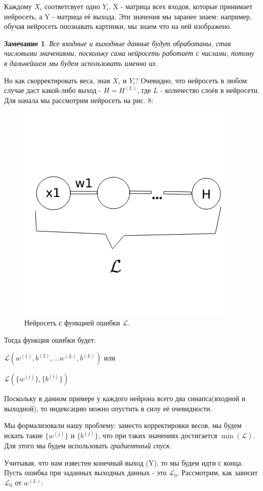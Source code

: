 \documentclass[12pt]{extarticle}
\newtheorem*{remark}{Замечание}
\begin{document}
	Каждому $X_i$ соответсвует одно $Y_i$. X - матрица всех входов, которые принимает нейросеть, а Y - матрица её выхода. Эти значения мы заранее знаем: например, обучая нейросеть опознавать картинки, мы знаем что на ней изображено. 
	
	\begin{remark}
		Все входные и выходные данные будут обработаны, став числовыми значениями, поскольку сама нейросеть работает с числами, потому в дальнейшем мы будем использовать именно их.
	\end{remark}
	
	Но как скорректировать веса, зная $X_i$ и $Y_i$? Очевидно, что нейросеть в любом случае даст какой-либо выход - $H = H^{(L)}$, где $L$ - количество слоёв в нейросети. Для начала мы рассмотрим нейросеть на  рис. 8:
		
	\begin{figure}[h]
			\centering
			\includegraphics[width=0.5\linewidth]{neuron_algorithm.png}
			\caption{Нейросеть с функцией ошибки $\mathcal{L}$.}
			\label{fig:mpr}
	\end{figure}
	
	\newpage
	
	Тогда функция ошибки будет: 
	
			\centerline{$\mathcal{L}(w^{(1)}, b^{(2)}, \dots w^{(L)}, b^{(L)})$ или}
			\centerline{$\mathcal{L}(\{w^{(i)}\}, \{b^{(i)}\})$}
	
	Поскольку в данном примере у каждого нейрона всего два синапса(входной и выходной), то индексацию можно опустить в силу её очевидности.
	
	Мы формализовали нашу проблему: заместо корректировки весов, мы будем искать такие $\{w^{(j)}\}$ и $\{b^{(j)}\}$, что при таких значениях достигается $\min(\mathcal{L})$. Для этого мы будем использовать \textit{градиентный спуск}.
	
	Учитывая, что нам известен конечный выход (Y), то мы будем идти с конца. Пусть ошибка при заданных выходных данных - это $\mathcal{L}_0$.
	Рассмотрим, как зависит $\mathcal{L}_0$ от $w^{(L)}$:
	
\end{document}
